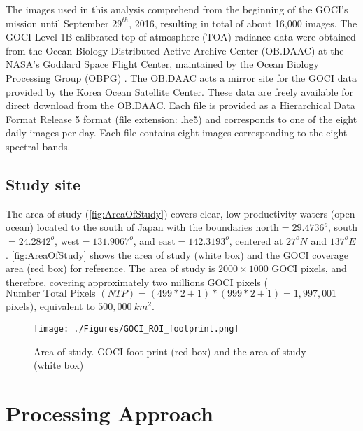 \documentclass[onecolumn,3p,letterpaper,11pt]{elsarticle}
\begin{document}
The images used in this analysis comprehend from the beginning of the GOCI's mission until September $29^{th}$, 2016, resulting in total of about 16,000 images. The GOCI Level-1B calibrated top-of-atmosphere (TOA) radiance data were obtained from the Ocean Biology Distributed Active Archive Center (OB.DAAC) at the NASA's Goddard Space Flight Center, maintained by the Ocean Biology Processing Group (OBPG) . The OB.DAAC acts a mirror site for the GOCI data provided by the Korea Ocean Satellite Center. These data are freely available for direct download from the OB.DAAC. Each file is provided as a  Hierarchical Data Format Release 5 format (file extension: .he5) and corresponds to one of the eight daily images per day. Each file contains eight images corresponding to the eight spectral bands.
\subsection{Study site}

The area of study (\autoref{fig:AreaOfStudy}) covers clear, low-productivity waters (open ocean) located to the south of Japan with the boundaries north$=29.4736^o$, south$=24.2842^o$, west$=131.9067^o$, and east$=142.3193^o$, centered at $27^oN$ and $137^oE$. \autoref{fig:AreaOfStudy} shows the area of study (white box) and the GOCI coverage area (red box) for reference. The area of study is $2000\times 1000$ GOCI pixels, and therefore, covering approximately two millions GOCI pixels ($\text{Number Total Pixels } (NTP) = (499*2+1)*(999*2+1) =  1,997,001$ pixels), equivalent to $500,000\ km^2$.  

\begin{figure}[ht]
	\centering
    \texttt{[image: ./Figures/GOCI\_ROI\_footprint.png]}
	\caption{Area of study. GOCI foot print (red box) and the area of study (white box)}
	\label{fig:AreaOfStudy}
\end{figure}
\section{Processing Approach}
\end{document}
